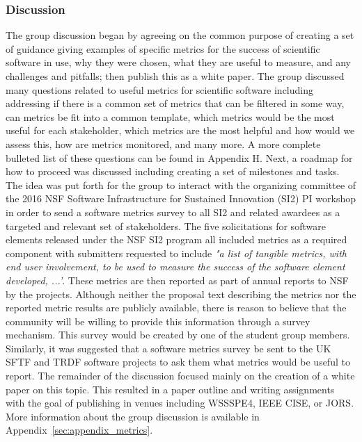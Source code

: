 \subsubsection{Discussion}

The group discussion began by agreeing on the common purpose of creating a set of guidance giving examples of specific metrics for the success of scientific 
software in use, why they were chosen, what they are useful to measure, and any challenges and pitfalls; then publish this as a white paper. 
 The group discussed many questions related to useful metrics for scientific software including addressing if there is a common set of metrics that 
 can be filtered in some way, can metrics be fit into a common template, which metrics would be the most useful for each stakeholder, 
 which metrics are the most helpful and how would we assess this, how are metrics monitored, and many more.  
 A more complete bulleted list of these questions can be found in Appendix H.  Next, a roadmap for how to proceed was discussed including
 creating a set of milestones and tasks.  The idea was put forth for the group to interact with the organizing committee of the 2016 NSF Software Infrastructure
  for Sustained Innovation (SI2) PI workshop in order to send a software metrics survey to all SI2 and related awardees as a targeted and relevant set of stakeholders.  
 The five solicitations for software elements released  under the NSF SI2 program all included metrics as a required component with submitters requested to include 
 {\it "a list of tangible metrics, with end user involvement, to be used to measure the success of the software element developed, ...'}. These metrics are then reported as part of annual reports to NSF by the projects. Although neither the proposal text describing the metrics nor the reported metric results are publicly available, there is reason to believe that the community will be willing to provide this information through a survey mechanism. 
This survey would be created by one of the student group members.  Similarly, it was suggested that a software metrics survey be sent to the 
UK SFTF and TRDF software projects to ask them what metrics would be useful to report.  The remainder of the discussion focused mainly on the 
creation of a white paper on this topic.  This resulted in a paper outline and writing assignments with the goal of publishing in venues including 
WSSSPE4, IEEE CISE, or JORS. More information about the group discussion is available in Appendix~\ref{sec:appendix_metrics}.

